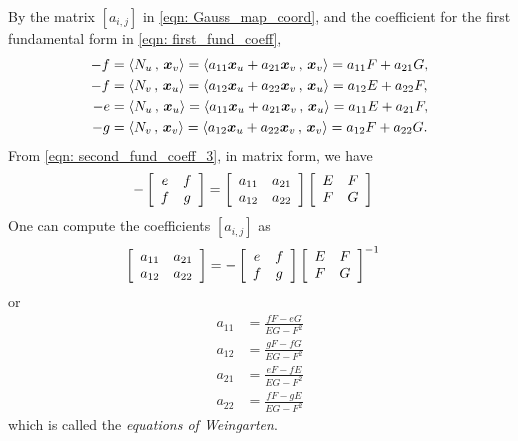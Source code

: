 \documentclass[11pt]{article}
\begin{document}
\begin{itemize}
By the matrix $[a_{i,j}]$ in \eqref{eqn: Gauss_map_coord}, and the coefficient for the first fundamental form in \eqref{eqn: first_fund_coeff}, 
\begin{align}
-f &=  \left\langle N_{u}\,,\, \boldsymbol{x}_{v} \right\rangle = \left\langle a_{11}\boldsymbol{x}_{u} + a_{21}\boldsymbol{x}_{v}\,,\, \boldsymbol{x}_{v} \right\rangle = a_{11}F + a_{21}G, \nonumber\\
-f &=  \left\langle N_{v}\,,\, \boldsymbol{x}_{u} \right\rangle = \left\langle a_{12}\boldsymbol{x}_{u} + a_{22}\boldsymbol{x}_{v}\,,\, \boldsymbol{x}_{u} \right\rangle = a_{12}E + a_{22}F, \nonumber\\
-e &= \left\langle N_{u}\,,\, \boldsymbol{x}_{u} \right\rangle  = \left\langle a_{11}\boldsymbol{x}_{u} + a_{21}\boldsymbol{x}_{v}\,,\, \boldsymbol{x}_{u} \right\rangle = a_{11}E + a_{21}F, \nonumber\\
-g &= \left\langle N_{v}\,,\, \boldsymbol{x}_{v} \right\rangle  = \left\langle a_{12}\boldsymbol{x}_{u} + a_{22}\boldsymbol{x}_{v}\,,\, \boldsymbol{x}_{v} \right\rangle = a_{12}F + a_{22}G. \label{eqn: second_fund_coeff_3} 
\end{align}
From \eqref{eqn: second_fund_coeff_3}, in matrix form, we have
\begin{align}
-\left[\begin{array}{cc}
e & f \\ 
f & g
\end{array} \right]
&= 
\left[\begin{array}{cc}
a_{11} & a_{21} \\ 
a_{12} & a_{22}
\end{array} \right]
\left[\begin{array}{cc}
E & F \\ 
F & G
\end{array} \right]
\end{align}
One can compute the coefficients $[a_{i,j}]$ as
\begin{align*}
\left[\begin{array}{cc}
a_{11} & a_{21} \\ 
a_{12} & a_{22}
\end{array} \right]
&= -\left[\begin{array}{cc}
e & f \\ 
f & g
\end{array} \right]
\left[\begin{array}{cc}
E & F \\ 
F & G
\end{array} \right]^{-1}
\end{align*} or
\begin{align}
a_{11} &= \frac{fF- eG}{EG- F^{2}} \nonumber\\
a_{12} &= \frac{gF- fG}{EG- F^{2}} \nonumber\\
a_{21} &= \frac{eF- fE}{EG- F^{2}} \nonumber\\
a_{22} &= \frac{fF- gE}{EG- F^{2}} \label{eqn: weingarten}
\end{align}
which is called the \emph{equations of Weingarten}. 


\end{itemize}
\end{document}
